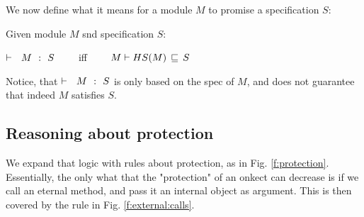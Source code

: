 We now define what it means for a module $M$ to promise a specification $S$:

\begin{definition}
Given module $M$ snd specification $S$:

\strut \hspace{2cm} ${\vdash \ \ M\ \ \mathbf{:}\ \ S}$ \ \ \ \  iff \ \ \ \  $M \vdash HS(M)\, \sqsubseteq\, S$
\end{definition}

Notice, that ${\vdash \ \ M\ \ \mathbf{:}\ \ S}$ is only based on the spec of $M$, and does not guarantee that indeed $M$ satisfies $S$.

% 
%
%
%
 


\subsection{Reasoning about protection}
We expand that logic with rules about protection, as in Fig. \ref{f:protection}. Essentially, the only what that the "protection" of an onkect can decrease is if we call an eternal method, and pass it an internal object as argument. This is then covered by the rule in Fig. \ref{f:external:calls}.

